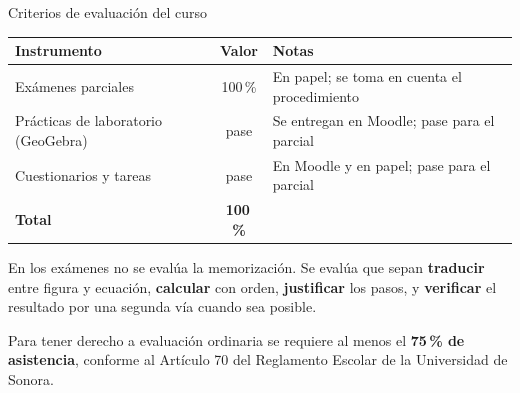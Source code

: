 \documentclass[aspectratio=169,10pt]{beamer}
\newcommand{\destaca}[1]{%
  \par\vspace{3pt}\noindent
  \colorbox{turquesaClaro}{%
    \parbox{\dimexpr\linewidth-2\fboxsep\relax}{\vspace{3pt}#1\vspace{3pt}}}%
  \par\vspace{3pt}}
\begin{document}
\begin{frame}{Criterios de evaluación del curso}
  \centering
  {\small
  \begin{tabular}{@{}p{5.4cm}c p{6cm}@{}}
    \toprule
    \textbf{Instrumento} & \textbf{Valor} & \textbf{Notas} \\
    \midrule
    Exámenes parciales & 100\,\% & En papel; se toma en cuenta el procedimiento \\
    Prácticas de laboratorio (GeoGebra) & pase & Se entregan en Moodle; pase para el parcial \\
    Cuestionarios y tareas & pase & En Moodle y en papel; pase para el parcial \\
    \midrule
    \textbf{Total} & \textbf{100\,\%} &  \\
    \bottomrule
  \end{tabular}}

  \vspace{0.5cm}
  \raggedright
  \destaca{En los exámenes no se evalúa la memorización. Se evalúa que
  sepan \textbf{traducir} entre figura y ecuación, \textbf{calcular}
  con orden, \textbf{justificar} los pasos, y \textbf{verificar} el
  resultado por una segunda vía cuando sea posible.}

\vspace{0.3cm}
  {\footnotesize Para tener derecho a evaluación ordinaria se requiere al
  menos el \textbf{75\,\% de asistencia}, conforme al Artículo 70 del
  Reglamento Escolar de la Universidad de Sonora.}
\end{frame}


\end{document}
